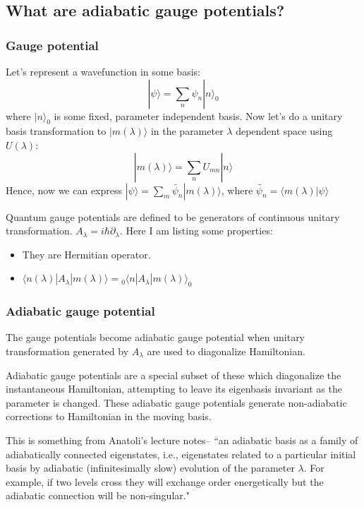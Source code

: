 \documentclass[11pt,a4paper]{article}
\begin{document}
\subsection{What are adiabatic gauge potentials?}
\subsubsection*{Gauge potential}
Let's represent a wavefunction in some basis:
\begin{equation}
|\psi \rangle= \sum_n \psi_n |n \rangle_0
\end{equation}
where $|n \rangle_0$ is some fixed, parameter independent basis. Now let's do a unitary basis transformation to $|m (\lambda) \rangle$ in the parameter $\lambda$ dependent space using $U(\lambda)$:
\begin{equation}
|m (\lambda) \rangle= \sum_n U_{mn} |n \rangle
\end{equation}
Hence, now we can express $|\psi \rangle = \sum_m \tilde{\psi_n}  |m (\lambda) \rangle $, where $\tilde{\psi_n}= \langle  m (\lambda) |\psi \rangle $
 
Quantum gauge potentials are defined to be generators of continuous unitary transformation.
$A_{\lambda}= i \hbar \partial_{\lambda}$. Here I am listing some properties:
\begin{itemize}
\item They are Hermitian operator.\
\item $\langle n (\lambda)| A_{\lambda}| m(\lambda) \rangle = {}_0\langle  n| A_{\lambda}| m(\lambda) \rangle_0$
\end{itemize}
 

\subsubsection*{Adiabatic gauge potential}
The gauge potentials become adiabatic gauge potential when unitary transformation generated by $A_{\lambda}$ are used to diagonalize Hamiltonian.

 Adiabatic gauge potentials are a special subset of these which diagonalize  the instantaneous Hamiltonian, attempting to leave its eigenbasis invariant as the parameter is changed. These adiabatic gauge potentials generate non-adiabatic corrections to Hamiltonian in the moving basis.
 
 This is something from Anatoli's lecture notes--
``an adiabatic basis as a family of adiabatically connected eigenstates, i.e., eigenstates related
to a particular initial basis by adiabatic (infinitesimally slow) evolution of the parameter $\lambda$. For example, if two levels cross they will exchange order energetically but the adiabatic connection will be non-singular."
\end{document}
